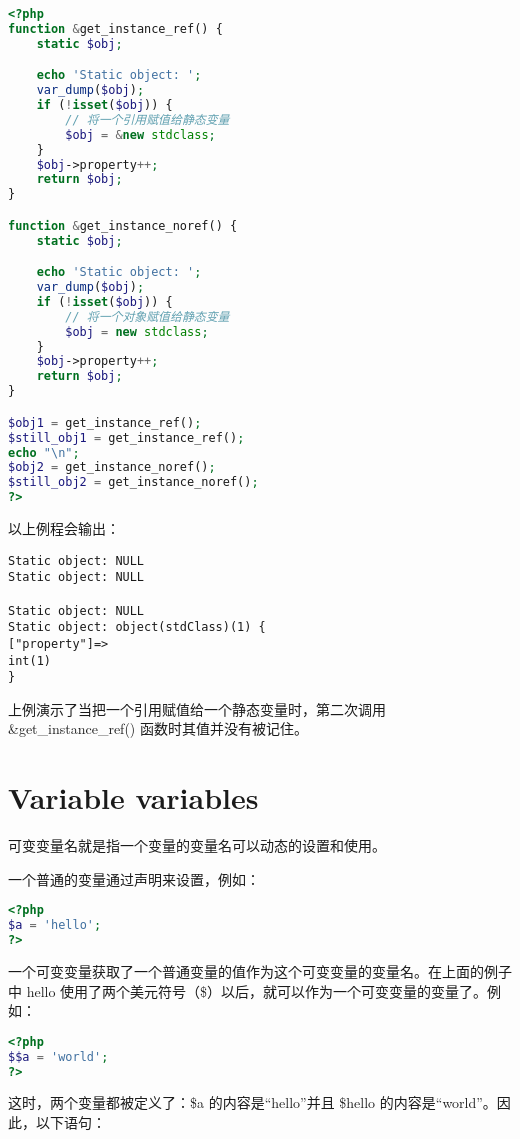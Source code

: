 \begin{lstlisting}[language=PHP]
<?php
function &get_instance_ref() {
    static $obj;

    echo 'Static object: ';
    var_dump($obj);
    if (!isset($obj)) {
        // 将一个引用赋值给静态变量
        $obj = &new stdclass;
    }
    $obj->property++;
    return $obj;
}

function &get_instance_noref() {
    static $obj;

    echo 'Static object: ';
    var_dump($obj);
    if (!isset($obj)) {
        // 将一个对象赋值给静态变量
        $obj = new stdclass;
    }
    $obj->property++;
    return $obj;
}

$obj1 = get_instance_ref();
$still_obj1 = get_instance_ref();
echo "\n";
$obj2 = get_instance_noref();
$still_obj2 = get_instance_noref();
?>
\end{lstlisting}

以上例程会输出：

\begin{verbatim}
Static object: NULL
Static object: NULL

Static object: NULL
Static object: object(stdClass)(1) {
["property"]=>
int(1)
}
\end{verbatim}

上例演示了当把一个引用赋值给一个静态变量时，第二次调用 \&get\_instance\_ref() 函数时其值并没有被记住。

\section{Variable variables}


可变变量名就是指一个变量的变量名可以动态的设置和使用。

一个普通的变量通过声明来设置，例如：


\begin{lstlisting}[language=PHP]
<?php
$a = 'hello';
?>
\end{lstlisting}

一个可变变量获取了一个普通变量的值作为这个可变变量的变量名。在上面的例子中 hello 使用了两个美元符号（\$）以后，就可以作为一个可变变量的变量了。例如：


\begin{lstlisting}[language=PHP]
<?php
$$a = 'world';
?>
\end{lstlisting}

这时，两个变量都被定义了：\$a 的内容是“hello”并且 \$hello 的内容是“world”。因此，以下语句：



